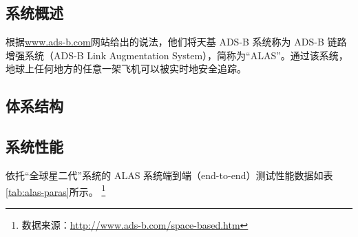 \subsection{系统概述}

根据\url{www.ads-b.com}网站给出的说法，他们将天基 ADS-B 系统称为 ADS-B 链路增强系统（ADS-B Link Augmentation System），简称为“ALAS”。通过该系统，地球上任何地方的任意一架飞机可以被实时地安全追踪。

\subsection{体系结构}

\subsection{系统性能}

依托“全球星二代”系统的 ALAS 系统端到端（end-to-end）测试性能数据如表\ref{tab:alas-paras}所示。 \footnote{数据来源：\url{http://www.ads-b.com/space-based.htm}}


